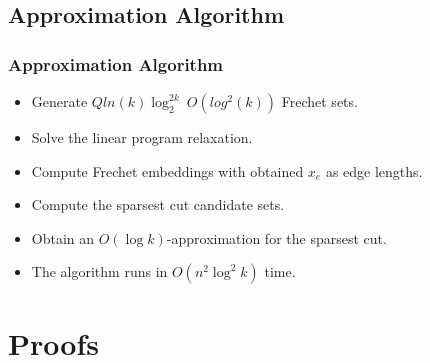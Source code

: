 \documentclass{beamer}
\begin{document}
\subsection{Approximation Algorithm}
\begin{frame}[allowframebreaks]
\frametitle{Approximation Algorithm}
\begin{itemize}
    \item Generate $Qln(k)\log_{2}^{2k} ~ O(log^2(k))$ Frechet sets.
    \item Solve the linear program relaxation.
    \item Compute Frechet embeddings with obtained $x_e$ as edge lengths.
    \item Compute the sparsest cut candidate sets.
    \item Obtain an $O(\log k)$-approximation for the sparsest cut.
    \item The algorithm runs in $O(n^2 \log^2 k)$ time.
    
\end{itemize}
\end{frame}

\section{Proofs}
\end{document}
